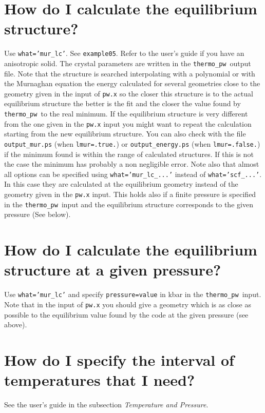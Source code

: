 \documentclass[12pt,a4paper]{article}
\def\thermo{\texttt{thermo\_pw}}
\begin{document}
\section{\color{coral}How do I calculate the equilibrium structure?}
Use \texttt{what='mur\_lc'}. See \texttt{example05}. Refer to the user's
guide if you have an anisotropic solid. The crystal
parameters are written in the \thermo\ output file. Note that the structure is
searched interpolating with a polynomial or with the Murnaghan
equation the energy calculated for several geometries close to the geometry 
given in the input of \texttt{pw.x} so the closer this structure is to the 
actual equilibrium structure the better is the fit and the
closer the value found by \thermo\ to the real minimum. If the 
equilibrium structure is very different from the one given in the 
\texttt{pw.x} input you might want to repeat the calculation starting 
from the new equilibrium structure. You can also check with the file
\texttt{output\_mur.ps} (when \texttt{lmur=.true.}) or 
\texttt{output\_energy.ps} (when \texttt{lmur=.false.}) if the minimum
found is within the range of calculated structures. If this is not 
the case the minimum has probably a non negligible error.
Note also that almost all options can be specified using
\texttt{what='mur\_lc\_...'} instead of \texttt{what='scf\_...'}.
In this case they are calculated at the equilibrium geometry instead of
the geometry given in the \texttt{pw.x} input. 
This holds also if a finite pressure is specified in the \thermo\ input 
and the equilibrium structure corresponds to the given pressure (See below).

\section{\color{coral}How do I calculate the equilibrium structure 
at a given pressure?}
Use \texttt{what='mur\_lc'} and specify \texttt{pressure=value} in kbar in the
\thermo\ input. Note that in the input of \texttt{pw.x} you should 
give a geometry which is as close as possible to the equilibrium value
found by the code at the given pressure (see above).

\section{\color{coral} How do I specify the interval of temperatures that 
I need?}
See the user's guide in the subsection {\it Temperature and Pressure}.
\end{document}
